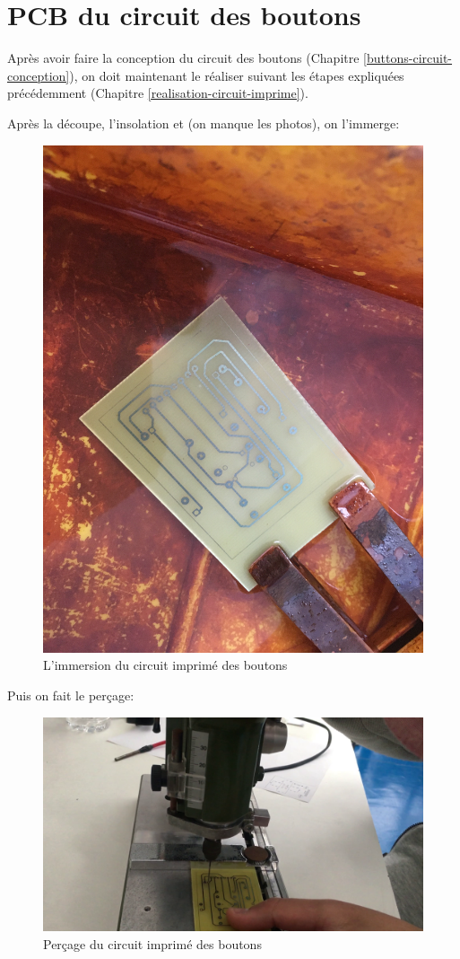 \FloatBarrier

\section{PCB du circuit des boutons}
Après avoir faire la conception du circuit des boutons (Chapitre \ref{buttons-circuit-conception}), on doit maintenant le réaliser suivant les étapes expliquées précédemment (Chapitre \ref{realisation-circuit-imprime}).

Après la découpe, l'insolation et  (on manque les photos), on l'immerge:

\begin{figure}[!htbp]
    \centering
    \includegraphics[width=.6\textwidth]{assets/realisation/cartes/2022-03-25 12.20.16.jpeg}
    \caption{L'immersion du circuit imprimé des boutons}
\end{figure}

\FloatBarrier

Puis on fait le perçage:

\begin{figure}[!htbp]
    \centering
    \includegraphics[width=\textwidth]{assets/realisation/cartes/vlcsnap-2022-04-14-04h43m27s441.png}
    \caption{Perçage du circuit imprimé des boutons}
\end{figure}

